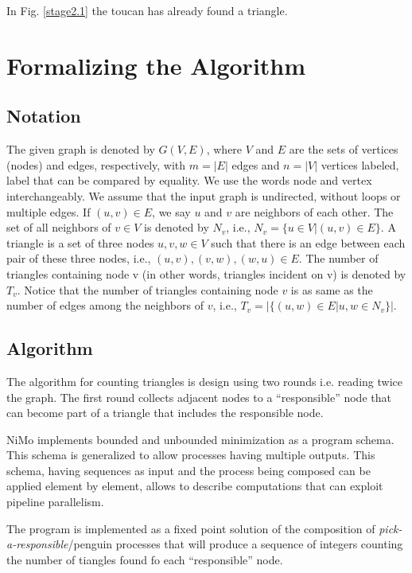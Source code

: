 \documentclass{article}                     \usepackage{graphics}
\begin{document}
In Fig. \ref{stage2.1} the toucan has already found a triangle.

	\section{Formalizing the Algorithm}		
\subsection{Notation}

The given graph  is denoted by $G(V,E)$, where $V$ and $E$
are the sets of vertices (nodes) and edges, respectively, with
$m = |E|$ edges and $n = |V |$ vertices labeled, label that can be compared by equality. We use the words node and vertex interchangeably. We
assume that the input graph is undirected, without loops or multiple  edges. If $(u, v) \in E$,
we say $u$ and $v$ are neighbors of each other. The set of
all neighbors of $v \in V$ is denoted by $N_v$, i.e., $N_v = \{u \in V |(u, v) \in E\}$.
A triangle is a set of three nodes $u, v,w \in  V$ such that
there is an edge between each pair of these three nodes, i.e.,
$(u, v), (v,w), (w, u) \in E$. The number of triangles containing
node v (in other words, triangles incident on v) is denoted
by $T_v$. Notice that the number of triangles containing node
$v$ is as same as the number of edges among the neighbors of
$v$, i.e., $T_v = | \{(u,w) \in  E | u,w \in N_v\} |$. 


\subsection{Algorithm}\label{formal}

The algorithm for counting triangles is design using two rounds i.e. reading twice the graph. The first round collects adjacent nodes to a ``responsible'' node that can become part of a triangle that includes the responsible node. 


NiMo implements bounded and unbounded minimization \cite{opac-b1083142} as a program schema. This schema is generalized to allow processes having  multiple outputs. 
This schema, having  sequences as input and the process being composed can be applied element by element, allows to describe computations that  can exploit pipeline parallelism.


The program is implemented as a fixed point solution of the composition of \textit{pick-a-responsible}/penguin processes that will produce a sequence of integers counting the number of tiangles found  fo each ``responsible'' node.
\end{document}
